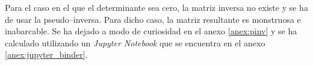 Para el caso en el que el determinante sea cero, la matriz inversa no existe y se
ha de usar la pseudo--inversa. Para dicho caso, la matriz resultante es monstruosa
e inabarcable. Se ha dejado a modo de curiosidad en el anexo \ref{anex:pinv} y se ha
calculado utilizando un \textit{Jupyter Notebook} que se encuentra en el anexo
\ref{anex:jupyter_binder}.